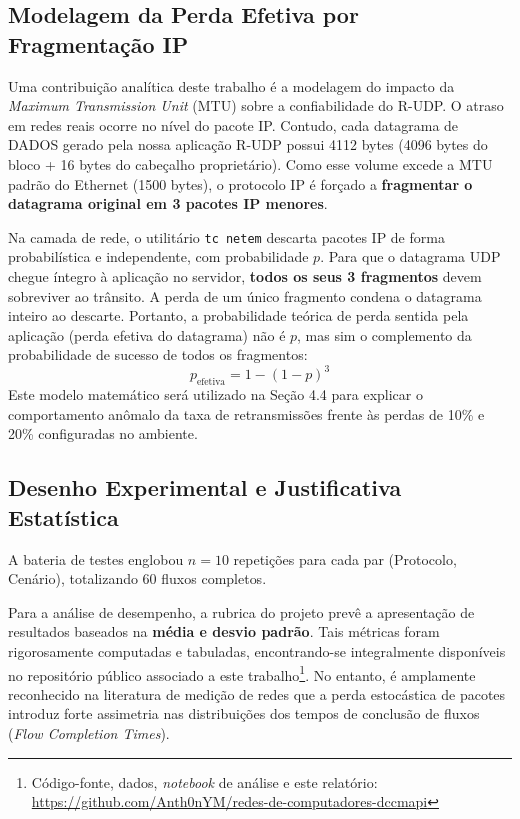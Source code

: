 \documentclass[12pt]{article}
\begin{document}
\subsection{Modelagem da Perda Efetiva por Fragmentação IP}

Uma contribuição analítica deste trabalho é a modelagem do impacto da \emph{Maximum Transmission Unit} 
(MTU) sobre a confiabilidade do R-UDP. O atraso em redes reais ocorre no nível do pacote IP. Contudo, 
cada datagrama de DADOS gerado pela nossa aplicação R-UDP possui 4112 bytes (4096 bytes do bloco + 16 bytes 
do cabeçalho proprietário). Como esse volume excede a MTU padrão do Ethernet (1500 bytes), o protocolo IP 
é forçado a \textbf{fragmentar o datagrama original em 3 pacotes IP menores}.

Na camada de rede, o utilitário \texttt{tc netem} descarta pacotes IP de forma probabilística e independente, 
com probabilidade $p$. Para que o datagrama UDP chegue íntegro à aplicação no servidor, \textbf{todos os seus 
3 fragmentos} devem sobreviver ao trânsito. A perda de um único fragmento condena o datagrama inteiro ao 
descarte. Portanto, a probabilidade teórica de perda sentida pela aplicação (perda efetiva do datagrama) 
não é $p$, mas sim o complemento da probabilidade de sucesso de todos os fragmentos:
\begin{equation}
  p_{\text{efetiva}} = 1 - (1-p)^3
  \label{eq:frag}
\end{equation}
Este modelo matemático será utilizado na Seção 4.4 para explicar o comportamento anômalo da taxa de 
retransmissões frente às perdas de 10\% e 20\% configuradas no ambiente.

\subsection{Desenho Experimental e Justificativa Estatística}

A bateria de testes englobou $n = 10$ repetições para cada par (Protocolo, Cenário), totalizando 60 
fluxos completos. 

Para a análise de desempenho, a rubrica do projeto prevê a apresentação de resultados baseados na \textbf{média e 
desvio padrão}. Tais métricas foram rigorosamente computadas e tabuladas, encontrando-se integralmente
disponíveis no repositório público associado a este
trabalho\footnote{Código-fonte, dados, \emph{notebook} de análise e este relatório:
\url{https://github.com/Anth0nYM/redes-de-computadores-dccmapi}}. No entanto, é amplamente reconhecido na literatura
de medição de redes que a perda estocástica de pacotes introduz forte assimetria nas distribuições dos tempos 
de conclusão de fluxos (\emph{Flow Completion Times}). 
\end{document}
